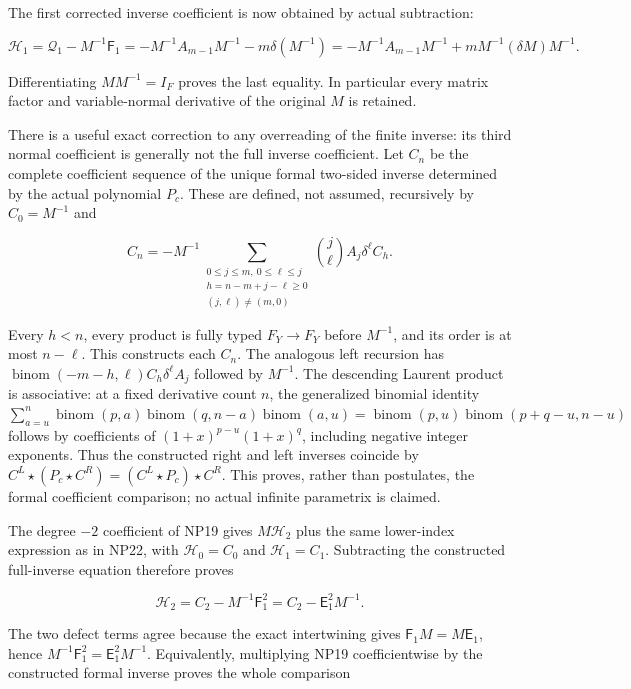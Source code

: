 \documentclass[
  11pt,
]{article}
\begin{document}
The first corrected inverse coefficient is now obtained by actual
subtraction:

\[
 \mathcal H_1=\mathcal Q_1-M^{-1}\mathsf F_1
   =-M^{-1}A_{m-1}M^{-1}-m\delta(M^{-1})
   =-M^{-1}A_{m-1}M^{-1}+mM^{-1}(\delta M)M^{-1}.
 \tag{NP21}
\]

Differentiating \(MM^{-1}=I_F\) proves the last equality. In particular
every matrix factor and variable-normal derivative of the original \(M\)
is retained.

There is a useful exact correction to any overreading of the finite
inverse: its third normal coefficient is generally not the full inverse
coefficient. Let \(C_n\) be the complete coefficient sequence of the
unique formal two-sided inverse determined by the actual polynomial
\(P_c\). These are defined, not assumed, recursively by \(C_0=M^{-1}\)
and

\[
 C_n=-M^{-1}
 \sum_{\substack{0\le j\le m,\ 0\le\ell\le j\\h=n-m+j-\ell\ge0\\(j,\ell)\ne(m,0)}}
       \binom j\ell A_j\delta^\ell C_h.
 \tag{NP22}
\]

Every \(h<n\), every product is fully typed \(F_Y\to F_Y\) before
\(M^{-1}\), and its order is at most \(n-\ell \). This constructs each
\(C_n\). The analogous left recursion has
\(\operatorname{binom}(-m-h,\ell )C_h\delta ^\ell A_j\) followed by
\(M^{-1}\). The descending Laurent product is associative: at a fixed
derivative count \(n\), the generalized binomial identity
\(\sum _{a=u}^n \operatorname{binom}(p,a)\operatorname{binom}(q,n-a)\operatorname{binom}(a,u)=\operatorname{binom}(p,u)\operatorname{binom}(p+q-u,n-u)\)
follows by coefficients of \((1+x)^{p-u}(1+x)^q\), including negative
integer exponents. Thus the constructed right and left inverses coincide
by \(C^L\star (P_c\star C^R)=(C^L\star P_c)\star C^R\). This proves,
rather than postulates, the formal coefficient comparison; no actual
infinite parametrix is claimed.

The degree \(-2\) coefficient of NP19 gives \(M\mathcal H _2\) plus the
same lower-index expression as in NP22, with \(\mathcal H _0=C_0\) and
\(\mathcal H _1=C_1\). Subtracting the constructed full-inverse equation
therefore proves

\[
 \boxed{\displaystyle
 \mathcal H_2=C_2-M^{-1}\mathsf F_1^2
             =C_2-\mathsf E_1^2M^{-1}.}
 \tag{NP23}
\]

The two defect terms agree because the exact intertwining gives
\(\mathsf F _1M=M\mathsf E _1\), hence
\(M^{-1}\mathsf F _1^2=\mathsf E _1^2M^{-1}\). Equivalently, multiplying
NP19 coefficientwise by the constructed formal inverse proves the whole
comparison
\end{document}
